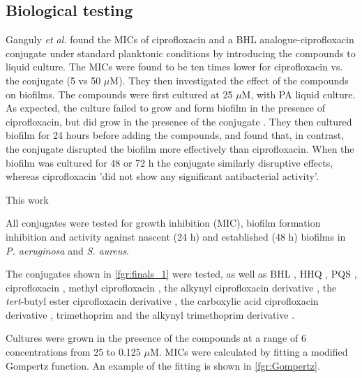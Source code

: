\subsection{Biological testing\label{sec:bio2}}


Ganguly \textit{et al.} \cite{Ganguly2011} found the MICs of ciprofloxacin and a BHL analogue-ciprofloxacin conjugate  under standard planktonic conditions by introducing the compounds to liquid culture. The MICs were found to be ten times lower for ciprofloxacin vs. the conjugate  (5 vs 50 $\mu$M). They then investigated the effect of the compounds on biofilms. The compounds were first cultured at 25 $\mu$M, with PA liquid culture. As expected, the culture failed to grow and form biofilm in the presence of ciprofloxacin, but did grow in the presence of the conjugate . They then cultured biofilm for 24 hours before adding the compounds, and found that, in contrast, the conjugate  disrupted the biofilm more effectively than ciprofloxacin. When the biofilm was cultured for 48 or 72 h the conjugate similarly disruptive effects, whereas ciprofloxacin 'did not show any significant antibacterial activity'.

This work 

All conjugates were tested for growth inhibition (MIC), biofilm formation inhibition and activity against nascent (24 h) and established (48 h) biofilms in \textit{P. aeruginosa} and \textit{S. aureus}.

The conjugates shown in \ref{fgr:finals_1} were tested, as well as BHL , HHQ , PQS , ciprofloxacin , methyl ciprofloxacin , the alkynyl ciprofloxacin derivative , the \textit{tert}-butyl ester ciprofloxacin derivative , the carboxylic acid ciprofloxacin derivative , trimethoprim  and the alkynyl trimethoprim derivative .

Cultures were grown in the presence of the compounds at a range of 6 concentrations from 25 to 0.125 $\mu$M. MICs were calculated by fitting a modified Gompertz function\cite{Lambert2016}. An example of the fitting is shown in \ref{fgr:Gompertz}. 


